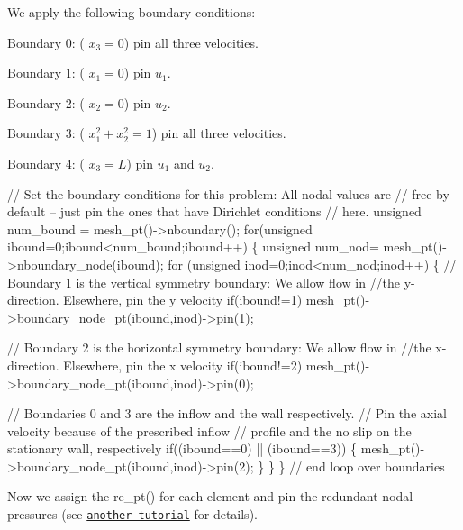 We apply the following boundary conditions\+:
\begin{DoxyItemize}
\item Boundary 0\+: ( $ x_3=0$) pin all three velocities.
\item Boundary 1\+: ( $ x_1=0$) pin $ u_1$.
\item Boundary 2\+: ( $ x_2=0$) pin $ u_2$.
\item Boundary 3\+: ( $ x_1^2+x_2^2=1$) pin all three velocities.
\item Boundary 4\+: ( $ x_3=L$) pin $ u_1 $ and $ u_2 $.
\end{DoxyItemize}
\begin{DoxyCodeInclude}
 
 
 \textcolor{comment}{// Set the boundary conditions for this problem: All nodal values are}
 \textcolor{comment}{// free by default -- just pin the ones that have Dirichlet conditions}
 \textcolor{comment}{// here. }
 \textcolor{keywordtype}{unsigned} num\_bound = mesh\_pt()->nboundary();
 \textcolor{keywordflow}{for}(\textcolor{keywordtype}{unsigned} ibound=0;ibound<num\_bound;ibound++)
  \{
   \textcolor{keywordtype}{unsigned} num\_nod= mesh\_pt()->nboundary\_node(ibound);
   \textcolor{keywordflow}{for} (\textcolor{keywordtype}{unsigned} inod=0;inod<num\_nod;inod++)
    \{
     \textcolor{comment}{// Boundary 1 is the vertical symmetry boundary: We allow flow in }
     \textcolor{comment}{//the y-direction. Elsewhere, pin the y velocity}
     \textcolor{keywordflow}{if}(ibound!=1) mesh\_pt()->boundary\_node\_pt(ibound,inod)->pin(1);

     \textcolor{comment}{// Boundary 2 is the horizontal symmetry boundary: We allow flow in }
     \textcolor{comment}{//the x-direction. Elsewhere, pin the x velocity}
     \textcolor{keywordflow}{if}(ibound!=2) mesh\_pt()->boundary\_node\_pt(ibound,inod)->pin(0);

     \textcolor{comment}{// Boundaries 0 and 3 are the inflow and the wall respectively.}
     \textcolor{comment}{// Pin the axial velocity because of the prescribed inflow}
     \textcolor{comment}{// profile and the no slip on the stationary wall, respectively}
     \textcolor{keywordflow}{if}((ibound==0) || (ibound==3)) 
      \{
       mesh\_pt()->boundary\_node\_pt(ibound,inod)->pin(2);
      \}
    \}
  \} \textcolor{comment}{// end loop over boundaries}

\end{DoxyCodeInclude}


Now we assign the {\ttfamily re\+\_\+pt()} for each element and pin the redundant nodal pressures (see \href{../../../navier_stokes/adaptive_driven_cavity/html/index.html}{\tt another tutorial} for details).



